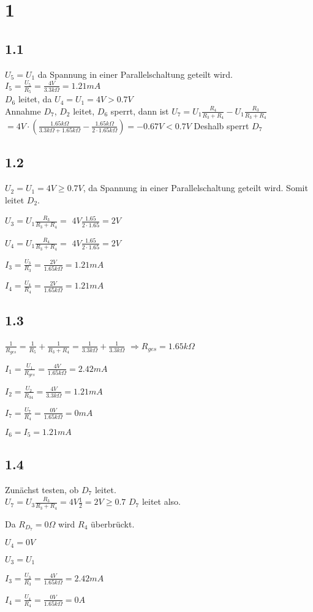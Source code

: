 \documentclass{article}
\begin{document}
\section*{1}
\subsection*{1.1}
$U_5 = U_1$ da Spannung in einer Parallelschaltung geteilt wird.\\
$I_5 = \frac{U_5}{R_5}=\frac{4V}{3.3k\Omega}=1.21mA$\\
$D_6$ leitet, da $U_4 = U_1 = 4V > 0.7V$\\
Annahme $D_7$, $D_2$ leitet, $D_6$ sperrt, dann ist
$U_7 = U_1 \frac{R_4}{R_3 + R_4} - U_1\frac{R_3}{R_3+R_4} $\\ 
$=4V \cdot (\frac{1.65k\Omega}{3.3k\Omega + 1.65k\Omega} - 
\frac{1.65k\Omega}{2 \cdot 1.65k\Omega}) = -0.67V < 0.7V$
Deshalb sperrt $D_7$
\subsection*{1.2}
$U_2 = U_1 = 4V \geq 0.7V$, da Spannung in einer
Parallelschaltung geteilt wird. Somit leitet $D_2$.

$U_3 = U_1 \frac{R_3}{R_3 + R_4} =$
$4V \frac{1.65}{2\cdot 1.65}= 2V$

$U_4 = U_1 \frac{R_4}{R_3 + R_4} =$
$4V \frac{1.65}{2\cdot 1.65}= 2V$

$I_3 = \frac{U_3}{R_3} = \frac{2V}{1.65k\Omega}=1.21mA$

$I_4 = \frac{U_4}{R_4} = \frac{2V}{1.65k\Omega}=1.21mA$

\subsection*{1.3}
$\frac{1}{R_{ges}} = \frac{1}{R_5}+\frac{1}{R_3 + R_4}
= \frac{1}{3.3k\Omega} + \frac{1}{3.3k\Omega}$
$\Rightarrow R_{ges} = 1.65k\Omega$

$I_1 = \frac{U_1}{R_{ges}} = \frac{4V}{1.65k\Omega} = 2.42mA$


$I_2 = \frac{U_2}{R_{34}} = \frac{4V}{3.3k\Omega} = 1.21mA$

$I_7 = \frac{U_7}{R_4} = \frac{0V}{1.65k\Omega} = 0mA$

$I_6 = I_5 = 1.21mA$

\subsection*{1.4}
Zunächst testen, ob $D_7$ leitet.\\
$U_7=U_3\frac{R_3}{R_3+R_4}=4V\frac{1}{2}=2V\geq 0.7$
$D_7$ leitet also.

Da $R_{D_7} = 0\Omega$ wird $R_4$ überbrückt. 

$U_4 = 0V$

$U_3 = U_1$

$I_3=\frac{U_3}{R_3}=\frac{4V}{1.65k\Omega}=2.42mA$

$I_4=\frac{U_4}{R_4}=\frac{0V}{1.65k\Omega}=0A$
\end{document}
